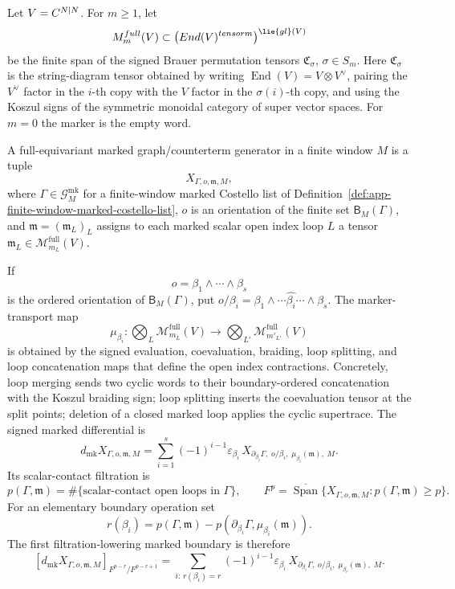 \begin{defn}
\label{def:app-oriented-full-equivariant-marked-boundary-complex}
  Let \(V=C^{N|N}\).  For \(m\geq1\), let
  \[
    \mathcal M_m^{\mathrm{full}}(V)
      \subset
    \bigl(\operatorname{End}(V)^{\otimes m}\bigr)^{\lie{gl}(V)}
  \]
  be the finite span of the signed Brauer permutation tensors
  \(\mathfrak C_\sigma\), \(\sigma\in S_m\).  Here
  \(\mathfrak C_\sigma\) is the string-diagram tensor obtained by
  writing
  \(\operatorname{End}(V)=V\otimes V^\vee\), pairing the \(V^\vee\)
  factor in the \(i\)-th copy with the \(V\) factor in the
  \(\sigma(i)\)-th copy, and using the Koszul signs of the symmetric
  monoidal category of super vector spaces.  For \(m=0\) the marker is
  the empty word.

  A full-equivariant marked graph/counterterm generator in a finite
  window \(M\) is a tuple
  \[
    X_{\Gamma,o,\mathfrak m,M},
  \]
  where \(\Gamma\in\mathcal G^{\mathrm{mk}}_M\) for a finite-window
  marked Costello list of
  Definition~\ref{def:app-finite-window-marked-costello-list},
  \(o\) is an orientation of the finite set
  \(\mathsf B_M(\Gamma)\), and
  \(\mathfrak m=(\mathfrak m_L)_L\) assigns to each marked scalar open
  index loop \(L\) a tensor
  \(\mathfrak m_L\in\mathcal M_{m_L}^{\mathrm{full}}(V)\).

  If
  \[
    o=\beta_1\wedge\cdots\wedge\beta_s
  \]
  is the ordered orientation of \(\mathsf B_M(\Gamma)\), put
  \(o/\beta_i=\beta_1\wedge\cdots\widehat{\beta_i}\cdots\wedge\beta_s\).
  The marker-transport map
  \[
    \mu_{\beta_i}\colon
    \bigotimes_L\mathcal M_{m_L}^{\mathrm{full}}(V)
    \longrightarrow
    \bigotimes_{L'}\mathcal M_{m'_{L'}}^{\mathrm{full}}(V)
  \]
  is obtained by the signed evaluation, coevaluation, braiding, loop
  splitting, and loop concatenation maps that define the open index
  contractions.  Concretely, loop merging sends two cyclic words to their
  boundary-ordered concatenation with the Koszul braiding sign; loop
  splitting inserts the coevaluation tensor at the split points; deletion
  of a closed marked loop applies the cyclic supertrace.  The signed
  marked differential is
  \[
    d_{\mathrm{mk}}X_{\Gamma,o,\mathfrak m,M}
      =
    \sum_{i=1}^{s}
      (-1)^{i-1}
      \varepsilon_{\beta_i}\,
      X_{\partial_{\beta_i}\Gamma,\;o/\beta_i,\;
        \mu_{\beta_i}(\mathfrak m),\;M}.
    \label{eq:app-oriented-marked-differential}
  \]
  Its scalar-contact filtration is
  \[
    p(\Gamma,\mathfrak m)
      =
    \#\{\text{scalar-contact open loops in }\Gamma\},
    \qquad
    F^p=\overline{\operatorname{Span}}\{X_{\Gamma,o,\mathfrak m,M}
      :p(\Gamma,\mathfrak m)\geq p\}.
  \]
  For an elementary boundary operation set
  \[
    r(\beta_i)
      =
    p(\Gamma,\mathfrak m)
      -p(\partial_{\beta_i}\Gamma,\mu_{\beta_i}(\mathfrak m)).
  \]
  The first filtration-lowering marked boundary is therefore
  \[
    \left[d_{\mathrm{mk}}X_{\Gamma,o,\mathfrak m,M}
    \right]_{F^{p-r}/F^{p-r+1}}
      =
    \sum_{i:\,r(\beta_i)=r}
      (-1)^{i-1}
      \varepsilon_{\beta_i}\,
      X_{\partial_{\beta_i}\Gamma,\;o/\beta_i,\;
        \mu_{\beta_i}(\mathfrak m),\;M}.
    \label{eq:app-oriented-marked-first-lowering}
  \]
\end{defn}

